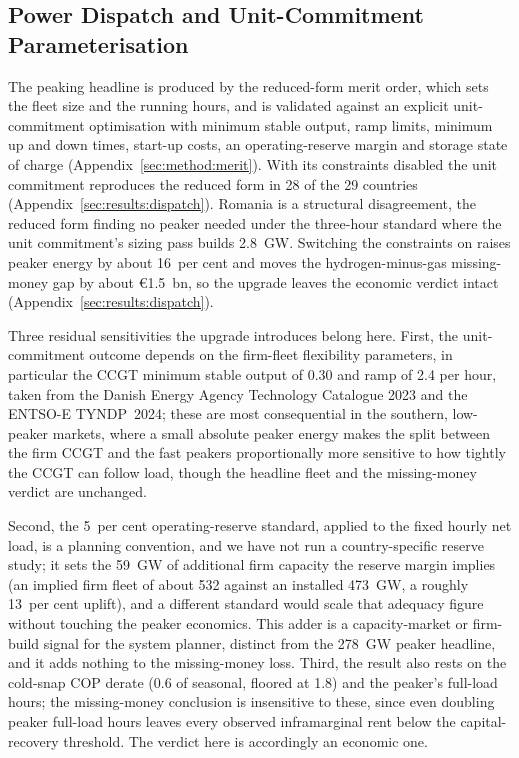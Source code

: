 \subsection{Power Dispatch and Unit-Commitment Parameterisation}
The peaking headline is produced by the reduced-form merit order, which sets the fleet
size and the running hours, and is validated against an explicit unit-commitment
optimisation with minimum stable output, ramp limits, minimum up and down times,
start-up costs, an operating-reserve margin and storage state of charge
(Appendix~\ref{sec:method:merit}). With its constraints disabled the unit commitment
reproduces the reduced form in 28 of the 29 countries
(Appendix~\ref{sec:results:dispatch}). Romania is a structural disagreement,
the reduced form finding no peaker needed under the three-hour standard where the
unit commitment's sizing pass builds 2.8~GW.
Switching the constraints on raises peaker energy by about
16~per cent and moves the hydrogen-minus-gas missing-money gap by about \euro{}1.5~bn,
so the upgrade leaves the economic verdict intact (Appendix~\ref{sec:results:dispatch}).

Three residual sensitivities the upgrade introduces belong here. First,
the unit-commitment outcome depends on the firm-fleet flexibility parameters, in
particular the CCGT minimum stable output of 0.30 and ramp of 2.4 per hour, taken from
the Danish Energy Agency Technology Catalogue 2023 \citep{DEA2023technology} and the
ENTSO-E TYNDP~2024; these are most consequential in the southern, low-peaker markets,
where a small absolute peaker energy makes the split between the firm CCGT and the fast
peakers proportionally more sensitive to how tightly the CCGT can follow load, though
the headline fleet and the missing-money verdict are unchanged.

Second, the 5~per cent operating-reserve standard, applied to the fixed hourly net load,
is a planning convention, and we have not run a country-specific reserve study; it sets
the 59~GW
of additional firm capacity the reserve margin implies (an implied firm fleet of about
532 against an installed 473~GW, a roughly 13~per cent uplift), and a different standard
would scale that adequacy figure without touching the peaker economics. This adder is a
capacity-market or firm-build signal for the system planner, distinct from the 278~GW
peaker headline, and it adds nothing to the missing-money loss. Third, the result also rests on
the cold-snap COP derate (0.6 of seasonal, floored at 1.8) and the peaker's full-load
hours; the missing-money conclusion is insensitive to these, since even doubling peaker
full-load hours leaves every observed inframarginal rent below the capital-recovery
threshold. The verdict here is accordingly an economic one.

